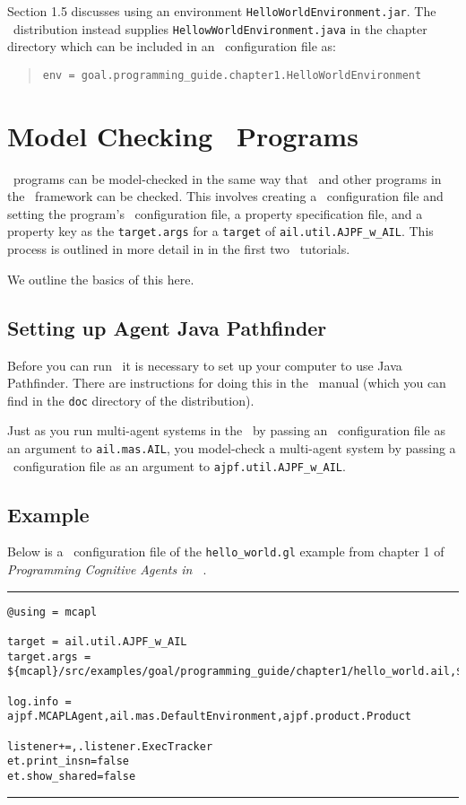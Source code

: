 Section 1.5 discusses using an environment \texttt{HelloWorldEnvironment.jar}.  The \mcapl\ distribution instead supplies \texttt{HellowWorldEnvironment.java} in the chapter directory which can be included in an \ail\ configuration file as:

\begin{quote}
  \texttt{env = goal.programming\_guide.chapter1.HelloWorldEnvironment}
\end{quote}

\section{Model Checking \goal\ Programs}

\goal\ programs can be model-checked in the same way that \gwendolen\ and other programs in the \ail\ framework can be checked.  This involves creating a \jpf\ configuration file and setting the program's \ail\ configuration file, a property specification file, and a property key as the \texttt{target.args} for a \texttt{target} of \texttt{ail.util.AJPF\_w\_AIL}.  This process is outlined in more detail in in the first two \ajpf\ tutorials.

We outline the basics of this here.

\subsection{Setting up Agent Java Pathfinder}
Before you can run \ajpf\ it is necessary to set up your computer to use Java Pathfinder.  There are instructions for doing this in the \mcapl\ manual (which you can find in the \texttt{doc} directory of the distribution).

Just as you run multi-agent systems in the \ail\ by passing an \ail\ configuration file as an argument to \texttt{ail.mas.AIL}, you model-check a multi-agent system by passing a \jpf\ configuration file as an argument to \texttt{ajpf.util.AJPF\_w\_AIL}.

\subsection{Example}
Below is a \jpf\ configuration file of the \texttt{hello\_world.gl} example from chapter 1 of \emph{Programming Cognitive Agents in \goal\ }.

\noindent\rule{\textwidth}{1pt}
\begin{small}
\begin{verbatim}
@using = mcapl

target = ail.util.AJPF_w_AIL
target.args = ${mcapl}/src/examples/goal/programming_guide/chapter1/hello_world.ail,${mcapl}/src/examples/goal/programming_guide/chapter1/simple.psl,1

log.info = ajpf.MCAPLAgent,ail.mas.DefaultEnvironment,ajpf.product.Product

listener+=,.listener.ExecTracker
et.print_insn=false
et.show_shared=false
\end{verbatim}
\end{small}
\rule{\textwidth}{1pt}

